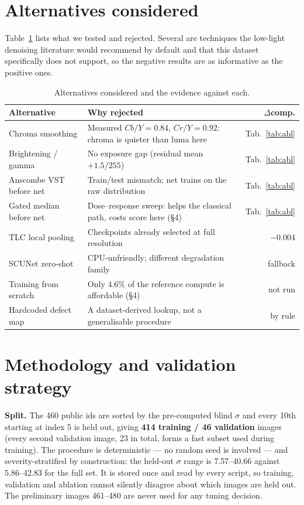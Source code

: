 \section{Alternatives considered}

Table~\ref{tab:alt} lists what we tested and rejected. Several are techniques the
low-light denoising literature would recommend by default and that this dataset
specifically does not support, so the negative results are as informative as the
positive ones.

\begin{table}[t]\centering\small
\begin{tabular}{p{44mm}p{68mm}r}
\toprule
Alternative & Why rejected & $\Delta$comp. \\
\midrule
Chroma smoothing & Measured $Cb/Y=0.84$, $Cr/Y=0.92$: chroma is quieter than luma here & Tab.~\ref{tab:abl} \\
Brightening / gamma & No exposure gap (residual mean $+1.5/255$) & Tab.~\ref{tab:abl} \\
Anscombe VST before net & Train/test mismatch; net trains on the raw distribution & Tab.~\ref{tab:abl} \\
Gated median before net & Dose--response sweep: helps the classical path, costs score here (\S4) & Tab.~\ref{tab:abl} \\
TLC local pooling & Checkpoints already selected at full resolution & $-0.004$ \\
SCUNet zero-shot & CPU-unfriendly; different degradation family & fallback \\
Training from scratch & Only $4.6\%$ of the reference compute is affordable (\S4) & not run \\
Hardcoded defect map & A dataset-derived lookup, not a generalisable procedure & by rule \\
\bottomrule
\end{tabular}
\caption{Alternatives considered and the evidence against each.}
\label{tab:alt}
\end{table}

\section{Methodology and validation strategy}

\textbf{Split.} The 460 public ids are sorted by the pre-computed blind $\sigma$ and
every 10th starting at index 5 is held out, giving \textbf{414 training / 46 validation}
images (every second validation image, 23 in total, forms a fast subset used during
training). The procedure is deterministic --- no random seed is involved --- and
severity-stratified by construction: the held-out $\sigma$ range is 7.57--40.66 against
5.86--42.83 for the full set. It is stored once and read by every script, so training,
validation and ablation cannot silently disagree about which images are held out. The
preliminary images 461--480 are never used for any tuning decision.

